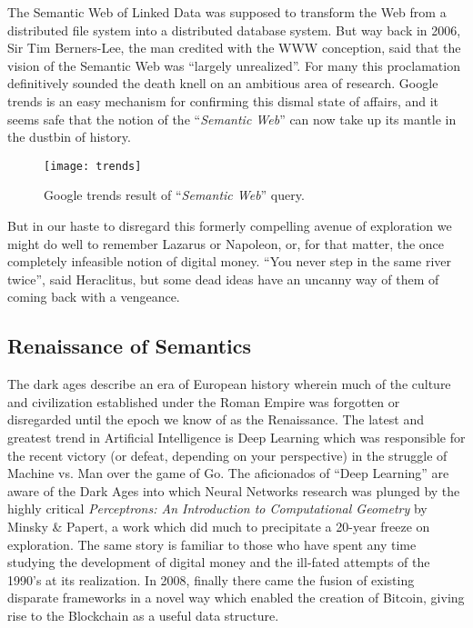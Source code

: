 The Semantic Web of Linked Data was supposed to transform the Web from a distributed file system into a distributed database system. 
But way back in 2006, Sir Tim Berners-Lee, the man credited with the WWW conception, said that the vision of the Semantic Web was ``largely unrealized''.
For many this proclamation definitively sounded the death knell on an ambitious area of research. 
Google trends is an easy mechanism for confirming this dismal state of affairs, and it seems safe that the notion of the ``\textit{Semantic Web}'' can now take up its mantle in the dustbin of history.

\begin{figure}[!ht]
  \centering
    \texttt{[image: trends]}
  \caption{Google trends result of ``\textit{Semantic Web}'' query.}
\end{figure}

But in our haste to disregard this formerly compelling avenue of exploration we might do well to remember Lazarus or Napoleon, or, for that matter, the once completely infeasible notion of digital money. ``You never step in the same river twice'', said Heraclitus, but some dead ideas have an uncanny way of them of coming back with a vengeance.

\subsection*{Renaissance of Semantics}

The dark ages describe an era of European history wherein much of the culture and civilization established under the Roman Empire was forgotten or disregarded until the epoch we know of as the Renaissance. 
The latest and greatest trend in Artificial Intelligence is Deep Learning which was responsible for the recent victory (or defeat, depending on your perspective) in the struggle of Machine vs. Man over the game of Go. 
The aficionados of ``Deep Learning'' are aware of the Dark Ages into which Neural Networks research was plunged by the highly critical \textit{Perceptrons: An Introduction to Computational Geometry} by Minsky \& Papert, a work which did much to precipitate a 20-year freeze on exploration. 
The same story is familiar to those who have spent any time studying the development of digital money and the ill-fated attempts of the 1990's at its realization. 
In 2008, finally there came the fusion of existing disparate frameworks in a novel way which enabled the creation of Bitcoin, giving rise to the Blockchain as a useful data structure.

